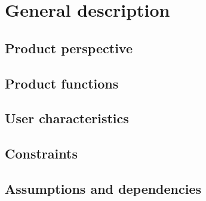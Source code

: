 \section{General description}

\subsection{Product perspective}
\subsection{Product functions}
\subsection{User characteristics}
\subsection{Constraints}
\subsection{Assumptions and dependencies}